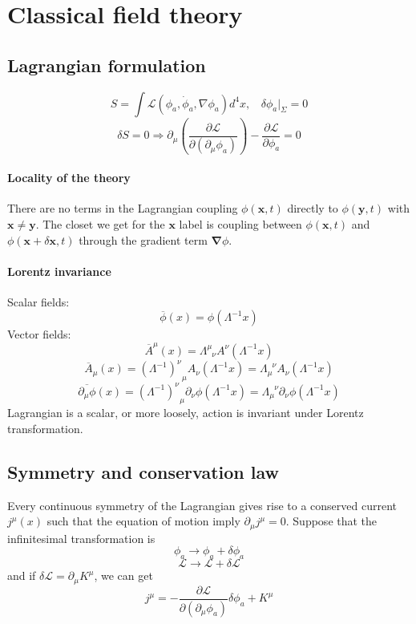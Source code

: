 \documentclass[cyan]{elegantnote}
\begin{document}
\chapter{Classical field theory}
\section{Lagrangian formulation}
\[S = \int \mathcal{L}(\phi_a,\dot{\phi}_a,\nabla \phi_a) d^4 x, \ \ \ \ \delta \phi_a |_{\Sigma} = 0\]
\[\delta S = 0 \Rightarrow \partial_{\mu} \left (\frac{\partial \mathcal{L}}{\partial (\partial_{\mu} \phi_a)} \right ) - \frac{\partial \mathcal{L}}{\partial \phi_a} = 0\]
\subsubsection{Locality of the theory}
There are no terms in the Lagrangian coupling $\phi(\bm{x},t)$ directly to  $\phi(\bm{y},t)$ with $\bm{x} \neq \bm{y}$. The closet we get for the $\bm{x}$ label is coupling between $\phi(\bm{x},t)$ and $\phi(\bm{x}+\delta\bm{x},t)$ through the gradient term $\bm{\nabla} \phi$.
\subsubsection{Lorentz invariance}
\noindent
Scalar fields:
\[\overline{\phi}(x) = \phi(\Lambda^{-1} x)\]
Vector fields:
\[\overline{A}^{\mu}(x) = \Lambda^{\mu}_{\phantom{\mu}\nu} A^{\nu}(\Lambda^{-1}x)\]
\[\overline{A}_{\mu}(x) = (\Lambda^{-1})^{\nu}_{\phantom{\mu}\mu} A_{\nu}(\Lambda^{-1}x) = \Lambda_{\mu}^{\phantom{\mu}\nu}A_{\nu}(\Lambda^{-1}x)\]
\[\overline{\partial_{\mu}\phi}(x) = (\Lambda^{-1})^{\nu}_{\phantom{\mu}\mu} \partial_{\nu} \phi (\Lambda^{-1}x) = \Lambda_{\mu}^{\phantom{\mu}\nu} \partial_{\nu} \phi (\Lambda^{-1}x)\]
Lagrangian is a scalar, or more loosely, action is invariant under Lorentz transformation.

\section{Symmetry and conservation law}
\begin{newthem}
Every continuous symmetry of the Lagrangian gives rise to a conserved current $j^{\mu}(x)$ such that the equation of motion imply $\partial_{\mu} j^{\mu} = 0$.
Suppose that the infinitesimal transformation is
\[\phi_a \rightarrow \phi_a + \delta \phi_a\]
\[\mathcal{L} \rightarrow  \mathcal{L} + \delta \mathcal{L} \]
and if $\delta \mathcal{L} = \partial_{\mu} K^{\mu}$, we can get
\[j^{\mu} = -\frac{\partial \mathcal{L}}{\partial (\partial_{\mu} \phi_a)} \delta \phi_a + K^{\mu}\]
\end{newthem}
\end{document}
